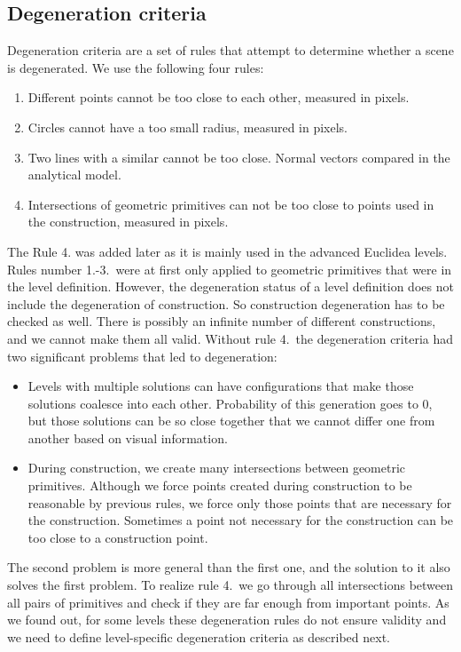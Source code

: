 \subsection{Degeneration criteria}
\label{degen_criteria}
Degeneration criteria are a set of rules that attempt to determine whether a scene is degenerated. 
We use the following four rules:
\begin{enumerate}
  \item Different points cannot be too close to each other, measured in pixels.
  \item Circles cannot have a too small radius, measured in pixels. 
  \item Two lines with a similar cannot be too close. Normal vectors compared in the analytical model.
  \item Intersections of geometric primitives can not be too close to points used in the construction, measured in pixels.
\end{enumerate}
The Rule 4. was added later as it is mainly used in the advanced Euclidea levels.
Rules number 1.-3.~were at first only applied to geometric primitives that were in the level definition. However, the degeneration status of a level definition does not include the degeneration of construction. So construction degeneration has to be checked as well. There is possibly an infinite number of different constructions, and we cannot make them all valid. 
\newline \newline
Without rule 4.~the degeneration criteria had two significant problems that led to degeneration:
\begin{itemize}
  \item Levels with multiple solutions can have configurations that make those solutions coalesce into each other. Probability of this generation goes to $0$, but those solutions can be so close together that we cannot differ one from another based on visual information.
  \item During construction, we create many intersections between geometric primitives. Although we force points created during construction to be reasonable by previous rules, we force only those points that are necessary for the construction. Sometimes a point not necessary for the construction can be too close to a construction point.
\end{itemize}
The second problem is more general than the first one, and the solution to it also solves the first problem. To realize rule 4.~we go through all intersections between all pairs of primitives and check if they are far enough from important points.
\newline \newline
As we found out, for some levels these degeneration rules do not ensure validity and we need to define level-specific degeneration criteria as described next.  

